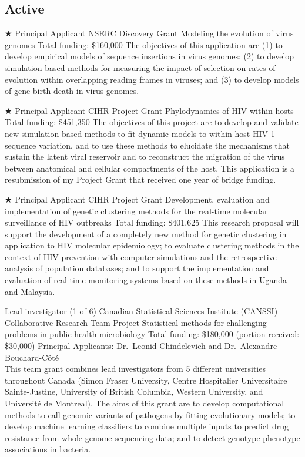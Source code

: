 \documentclass[11pt]{moderncv}
\begin{document}
\subsection {Active}


{$\bigstar$ Principal Applicant}
{NSERC Discovery Grant}
{Modeling the evolution of virus genomes}
{Total funding: \$160,000} %
{
The objectives of this application are (1) to develop empirical models of sequence insertions in virus genomes; (2) to develop simulation-based methods for measuring the impact of selection on rates of evolution within overlapping reading frames in viruses; and (3) to develop models of gene birth-death in virus genomes.\\
}



{$\bigstar$ Principal Applicant}
{CIHR Project Grant} %
{Phylodynamics of HIV within hosts}
{Total funding: \$451,350}
{
The objectives of this project are to develop and validate new simulation-based methods to fit dynamic models to within-host HIV-1 sequence variation, and to use these methods to elucidate the mechanisms that sustain the latent viral reservoir and to reconstruct the migration of the virus between anatomical and cellular compartments of the host.
This application is a resubmission of my Project Grant that received one year of bridge funding.\\ 
}


{$\bigstar$ Principal Applicant}
{CIHR Project Grant} %
{Development, evaluation and implementation of genetic clustering methods for the real-time molecular surveillance of HIV outbreaks}
{Total funding: \$401,625}
{
This research proposal will support the development of a completely new method for genetic clustering in application to HIV molecular epidemiology; 
to evaluate clustering methods in the context of HIV prevention with computer simulations and the retrospective analysis of population databases; 
and to support the implementation and evaluation of real-time monitoring systems based on these methods in Uganda and Malaysia.\\
}


{Lead investigator (1 of 6)}
{Canadian Statistical Sciences Institute (CANSSI) Collaborative Research Team Project}
{Statistical   methods   for   challenging   problems   in   public   health   microbiology}
{Total funding: \$180,000 (portion received: \$30,000)}
{Principal Applicants: Dr.~Leonid Chindelevich and Dr.~Alexandre Bouchard-C\^ot\'e\\
This team grant combines lead investigators from 5 different universities throughout Canada (Simon Fraser University,  Centre Hospitalier Universitaire Sainte-Justine, University of British Columbia, Western University, and Universit\'e de Montreal).
The aims of this grant are to develop computational methods to call genomic variants of pathogens by fitting evolutionary models; to develop machine learning classifiers to combine multiple inputs to predict drug resistance from whole genome sequencing data; and to detect genotype-phenotype associations in bacteria.\\
}
\end{document}
